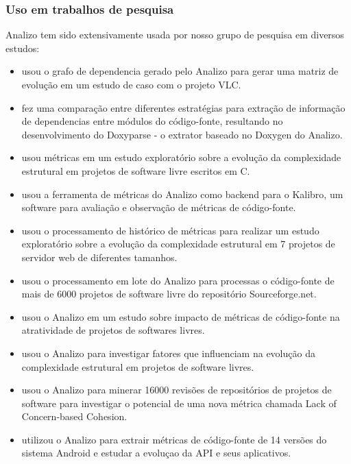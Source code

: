 \subsubsection{Uso em trabalhos de pesquisa}
\label{trabalhos-analizo}

Analizo tem sido extensivamente usada por nosso grupo de pesquisa em diversos
estudos:

\begin{itemize}

  \item \cite{Amaral2009} usou o grafo de dependencia gerado pelo Analizo para
  gerar uma matriz de evolução em um estudo de caso com o projeto VLC.

  \item \cite{Costa2009} fez uma comparação entre diferentes estratégias para
  extração de informação de dependencias entre módulos do código-fonte,
  resultando no desenvolvimento do Doxyparse - o extrator baseado no Doxygen do
  Analizo.

  \item \cite{Terceiro2009} usou métricas em um estudo exploratório sobre a
  evolução da complexidade estrutural em projetos de software livre escritos em
  C.

  \item \cite{Morais2009} usou a ferramenta de métricas do Analizo como backend
  para o Kalibro, um software para avaliação e observação de métricas de código-fonte.
  
  \item \cite{Terceiro2010} usou o processamento de histórico de métricas para
  realizar um estudo exploratório sobre a evolução da complexidade estrutural em
  7 projetos de servidor web de diferentes tamanhos.

  \item \cite{Meirelles2010} usou o processamento em lote do Analizo para
  processas o código-fonte de mais de 6000 projetos de software livre do
  repositório Sourceforge.net.

  \item \cite{Meirelles2011} usou o Analizo em um estudo sobre impacto de
  métricas de código-fonte na atratividade de projetos de softwares livres.

  \item \cite{Terceiro2012Understanding} usou o Analizo para investigar fatores
  que influenciam na evolução da complexidade estrutural em projetos de software
  livres.

  \item \cite{Silva2012} usou o Analizo para minerar 16000 revisões de
  repositórios de projetos de software para investigar o potencial de uma nova
  métrica chamada Lack of Concern-based Cohesion.

  \item \cite{Ronaldo2015} utilizou o Analizo para extrair métricas de
  código-fonte de 14 versões do sistema Android e estudar a evoluçao da API e
  seus aplicativos.

\end{itemize}

